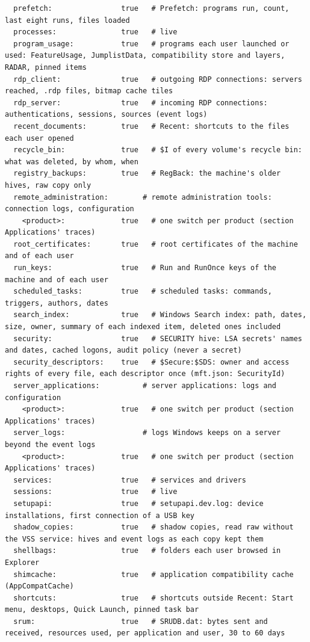 \documentclass[11pt,a4paper,oneside]{report}
\begin{document}
\begin{lstlisting}
  prefetch:                true   # Prefetch: programs run, count, last eight runs, files loaded
  processes:               true   # live
  program_usage:           true   # programs each user launched or used: FeatureUsage, JumplistData, compatibility store and layers, RADAR, pinned items
  rdp_client:              true   # outgoing RDP connections: servers reached, .rdp files, bitmap cache tiles
  rdp_server:              true   # incoming RDP connections: authentications, sessions, sources (event logs)
  recent_documents:        true   # Recent: shortcuts to the files each user opened
  recycle_bin:             true   # $I of every volume's recycle bin: what was deleted, by whom, when
  registry_backups:        true   # RegBack: the machine's older hives, raw copy only
  remote_administration:        # remote administration tools: connection logs, configuration
    <product>:             true   # one switch per product (section Applications' traces)
  root_certificates:       true   # root certificates of the machine and of each user
  run_keys:                true   # Run and RunOnce keys of the machine and of each user
  scheduled_tasks:         true   # scheduled tasks: commands, triggers, authors, dates
  search_index:            true   # Windows Search index: path, dates, size, owner, summary of each indexed item, deleted ones included
  security:                true   # SECURITY hive: LSA secrets' names and dates, cached logons, audit policy (never a secret)
  security_descriptors:    true   # $Secure:$SDS: owner and access rights of every file, each descriptor once (mft.json: SecurityId)
  server_applications:          # server applications: logs and configuration
    <product>:             true   # one switch per product (section Applications' traces)
  server_logs:                  # logs Windows keeps on a server beyond the event logs
    <product>:             true   # one switch per product (section Applications' traces)
  services:                true   # services and drivers
  sessions:                true   # live
  setupapi:                true   # setupapi.dev.log: device installations, first connection of a USB key
  shadow_copies:           true   # shadow copies, read raw without the VSS service: hives and event logs as each copy kept them
  shellbags:               true   # folders each user browsed in Explorer
  shimcache:               true   # application compatibility cache (AppCompatCache)
  shortcuts:               true   # shortcuts outside Recent: Start menu, desktops, Quick Launch, pinned task bar
  srum:                    true   # SRUDB.dat: bytes sent and received, resources used, per application and user, 30 to 60 days

\end{lstlisting}
\end{document}
